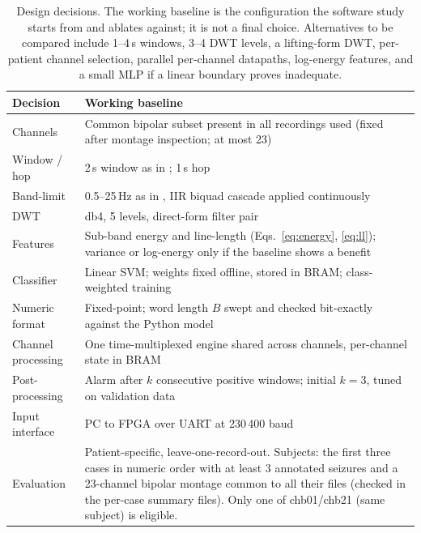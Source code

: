 \documentclass[10pt,twocolumn,letterpaper]{article}
\begin{document}
\begin{table}[t]
\centering
\caption{Design decisions. The working baseline is the configuration the
software study starts from and ablates against; it is not a final
choice. Alternatives to be compared include 1--4\,s windows, 3--4 DWT
levels, a lifting-form DWT, per-patient channel selection, parallel
per-channel datapaths, log-energy features, and a small MLP if a linear
boundary proves inadequate.}
\label{tab:decisions}
\small
\begin{tabularx}{\textwidth}{@{}p{3.2cm}X@{}}
\toprule
Decision & Working baseline \\
\midrule
Channels & Common bipolar subset present in all recordings used (fixed after montage inspection; at most 23) \\
Window / hop & 2\,s window as in \cite{shoeb2010icml}; 1\,s hop \\
Band-limit & 0.5--25\,Hz as in \cite{shoeb2010icml}, IIR biquad cascade applied continuously \\
DWT & db4, 5 levels, direct-form filter pair \\
Features & Sub-band energy and line-length (Eqs.~\ref{eq:energy}, \ref{eq:ll}); variance or log-energy only if the baseline shows a benefit \\
Classifier & Linear SVM; weights fixed offline, stored in BRAM; class-weighted training \\
Numeric format & Fixed-point; word length $B$ swept and checked bit-exactly against the Python model \\
Channel processing & One time-multiplexed engine shared across channels, per-channel state in BRAM \\
Post-processing & Alarm after $k$ consecutive positive windows; initial $k=3$, tuned on validation data \\
Input interface & PC to FPGA over UART at 230\,400 baud \\
Evaluation & Patient-specific, leave-one-record-out. Subjects: the first three cases
in numeric order with at least 3 annotated seizures and a 23-channel
bipolar montage common to all their files (checked in the per-case
summary files). Only one of chb01/chb21 (same subject) is eligible. \\
\bottomrule
\end{tabularx}
\end{table}
\end{document}
